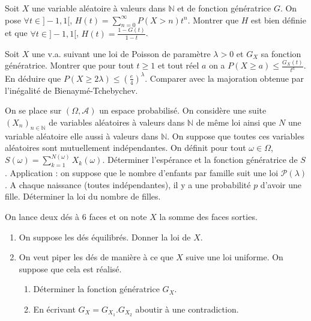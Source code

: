 \begin{exercice}
Soit $X$ une variable aléatoire à valeurs dans $\mathbb{N}$ et de fonction génératrice $G$. On pose $\forall t\in]-1,1[$, $H(t)=\sum_{n=0}^{\infty}P(X>n)t^{n}$.
Montrer que $H$ est bien définie et que $\forall t\in]-1,1[$, $H(t)=\frac{1-G(t)}{1-t}$.
\end{exercice}

\begin{exercice}
Soit $X$ une v.a. suivant une loi de Poisson de paramètre $\lambda>0$ et $G_{X}$ sa fonction génératrice.
Montrer que pour tout $t\ge1$ et tout réel $a$ on a $P(X\ge a)\le\frac{G_{X}(t)}{t^{a}}$.
En déduire que $P(X\ge2\lambda)\le(\frac{e}{4})^{\lambda}$.
Comparer avec la majoration obtenue par l'inégalité de Bienaymé-Tchebychev.
\end{exercice}

\begin{exercice}
On se place sur $(\Omega, \mathcal{A})$ un espace probabilisé. On considère une suite $(X_{n})_{n\in\mathbb{N}}$ de variables aléatoires à valeurs dans $\mathbb{N}$ de même loi ainsi que $N$ une variable aléatoire elle aussi à valeurs dans $\mathbb{N}$. On suppose que toutes ces variables aléatoires sont mutuellement indépendantes. On définit pour tout $\omega\in\Omega$, $S(\omega)=\sum_{k=1}^{N(\omega)}X_{k}(\omega)$.
Déterminer l'espérance et la fonction génératrice de $S$.
Application : on suppose que le nombre d'enfants par famille suit une loi $\mathcal{P}(\lambda)$. A chaque naissance (toutes indépendantes), il y a une probabilité $p$ d'avoir une fille. Déterminer la loi du nombre de filles.
\end{exercice}

\begin{exercice}
On lance deux dés à 6 faces et on note $X$ la somme des faces sorties.
\begin{enumerate}
    \item On suppose les dés équilibrés. Donner la loi de $X$.
    \item On veut piper les dés de manière à ce que $X$ suive une loi uniforme. On suppose que cela est réalisé.
    \begin{enumerate}
        \item Déterminer la fonction génératrice $G_{X}$.
        \item En écrivant $G_{X}=G_{X_{1}}.G_{X_{2}}$ aboutir à une contradiction.
    \end{enumerate}
\end{enumerate}
\end{exercice}

